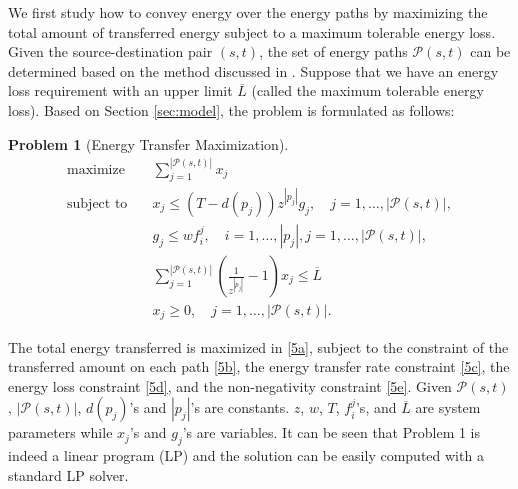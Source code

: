 \documentclass[journal]{IEEEtran}
\newtheorem{problem}{Problem}
\begin{document}
We first study how to convey energy over the energy paths by maximizing the total amount of transferred energy subject to a maximum tolerable energy loss.
Given the source-destination pair $(s,t)$, the set of energy paths $\mathcal{P}(s,t)$ can be determined based on the method discussed in \cite{VEN_infocom}. Suppose that we have an energy loss requirement with an upper limit $\overline{L}$ (called the maximum tolerable energy loss). Based on Section \ref{sec:model}, the problem is formulated as follows:
\begin{problem}[Energy Transfer Maximization]
\label{maxopt}
\begin{subequations}
\label{maxopteq}
\begin{align}
\text{maximize}\quad 	& \sum_{j=1}^{|\mathcal{P}(s,t)|}{x_j} \label{5a}\\
\text{subject to}\quad 
& x_j\leq (T-d(p_j))z^{|p_j|}g_j, \quad j=1,\ldots, |\mathcal{P}(s,t)|, \label{5b}\\
& g_j \leq w f_i^j, \quad i=1,\ldots,|p_j|, j=1,\ldots, |\mathcal{P}(s,t)|, \label{5c}\\
& \sum_{j=1}^{|\mathcal{P}(s,t)|}{(\frac{1}{z^{|p_j|}}-1)   x_j} \leq \overline{L} \label{5d}\\
& x_j\geq 0, \quad j=1,\ldots, |\mathcal{P}(s,t)| \label{5e}.
\end{align}
\end{subequations}
\end{problem}
The total energy transferred is maximized in \eqref{5a}, subject to the constraint of the transferred amount on each path \eqref{5b}, the energy transfer rate constraint \eqref{5c}, the energy loss constraint \eqref{5d}, and the non-negativity constraint \eqref{5e}. Given $\mathcal{P}(s,t)$, $|\mathcal{P}(s,t)|$, $d(p_j)$'s and $|p_j|$'s are constants. $z$, $w$, $T$, $f_i^j$'s, and $\overline{L}$ are system parameters while $x_j$'s and $g_j$'s are variables. It can be seen that Problem 1 is indeed a linear program (LP) and the solution can be easily computed with a standard LP solver.
\end{document}
